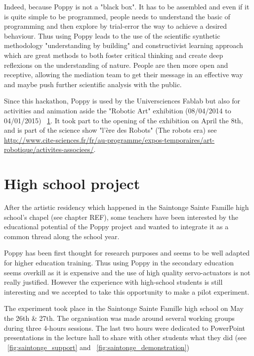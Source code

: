 Indeed, because Poppy is not a "black box". It has to be assembled and even if it is quite simple to be programmed, people needs to understand the basic of programming and then explore by trial-error the way to achieve a desired behaviour. Thus using Poppy leads to the use of the scientific synthetic methodology "understanding by building" and constructivist learning approach which are great methods to both foster critical thinking and create deep reflexions on the understanding of nature. People are then more open and receptive, allowing the mediation team to get their message in an effective way and maybe push further scientific analysis with the public.


Since this hackathon, Poppy is used by the Universciences Fablab but also for activities and animation aside the "Robotic Art" exhibition (08/04/2014 to 04/01/2015) \figurename~\ref{fig:universcience_art}. It took part to the opening of the exhibition on April the 8th, and is part of the science show "l'ère des Robots" (The robots era) see \url{http://www.cite-sciences.fr/fr/au-programme/expos-temporaires/art-robotique/activites-associees/}.

\begin{figure}[]
\centering
    \hfil
    \caption{}
    \label{fig:universcience_art}
\end{figure}


\section{High school project} %


After the artistic residency which happened in the Saintonge Sainte Famille high school's chapel (see chapter REF), some teachers have been interested by the educational potential of the Poppy project and wanted to integrate it as a common thread along the school year.

Poppy has been first thought for research purposes and seems to be well adapted for higher education training. Thus using Poppy in the secondary education seems overkill as it is expensive and the use of high quality servo-actuators is not really justified. However the experience with high-school students is still interesting and we accepted to take this opportunity to make a pilot experiment.


The experiment took place in the Saintonge Sainte Famille high school on May the 26th \& 27th. The organisation was made around several working groups during three 4-hours sessions. The last two hours were dedicated to PowerPoint presentations in the lecture hall to share with other students what they did (see \figurename~\ref{fig:saintonge_support} and \figurename~\ref{fig:saintonge_demonstration})

